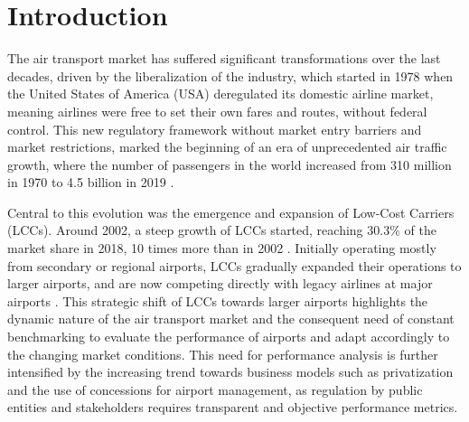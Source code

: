 
\section{Introduction}
\label{sec:intro}

The air transport market has suffered significant transformations over the last decades, driven by the
liberalization of the industry, which started in 1978 when the United States of America (USA) deregulated
its domestic airline market, meaning airlines were free to set their own fares and routes, without federal
control. This new regulatory framework without market entry
barriers and market restrictions, marked the beginning of an era of unprecedented air traffic growth, where the number of passengers in the world increased from 310 million in 1970 to 4.5 billion in 2019 \cite{worldevolution}.

Central to this evolution was the emergence and expansion of Low-Cost Carriers (LCCs). Around 2002, a steep growth of LCCs started, reaching
30.3\% of the market share in 2018, 10 times more than in 2002 \cite{sharelcc}. Initially operating mostly from secondary or regional airports,
LCCs gradually expanded their operations to larger airports, and are now competing directly with legacy
airlines at major airports \cite{jimenez2020}. This strategic shift of LCCs towards larger airports highlights
the dynamic nature of the air transport market and the consequent need of constant benchmarking to evaluate the performance of airports and adapt accordingly to the changing market conditions. This need for performance analysis is further intensified by the increasing trend towards business
models such as privatization and the use of concessions for airport management, as regulation by public
entities and stakeholders requires transparent and objective performance metrics.

